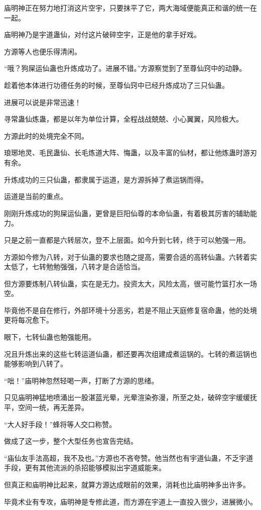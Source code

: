 \begin{this_body}
庙明神正在努力地打消这片空宇，只要抹平了它，两大海域便能真正和谐的统一在一起。

庙明神乃是宇道蛊仙，对付这片破碎空宇，正是他的拿手好戏。

方源等人也便乐得清闲。

“哦？狗屎运仙蛊也升炼成功了。进展不错。”方源察觉到了至尊仙窍中的动静。

趁着他本体进行功德任务的时候，至尊仙窍中已经升炼成功了三只仙蛊。

进展可以说是非常迅速！

寻常蛊仙炼蛊，都是以年为单位计算，全程战战兢兢、小心翼翼，风险极大。

方源此时的处境完全不同。

琅琊地灵、毛民蛊仙、长毛炼道大阵、悔蛊，以及丰富的仙材，都让他炼蛊时游刃有余。

升炼成功的三只仙蛊，都隶属于运道，是方源拆掉了煮运锅而得。

运道是当前的重点。

刚刚升炼成功的狗屎运仙蛊，更曾是巨阳仙尊的本命仙蛊，有着极其厉害的辅助能力。

只是之前一直都是六转层次，登不上层面。如今升到七转，终于可以勉强一用。

方源如今修为八转，对于仙蛊的要求也随之提高，需要合适的高转仙蛊。六转着实太低了，七转勉勉强强，八转才是合适恰当。

但方源要炼制八转仙蛊，实在是无力。投资太大，风险太高，很可能竹篮打水一场空。

毕竟他不是自在修行，外部环境十分恶劣，若是不阻止天庭修复宿命蛊，他的处境更将每况愈下。

眼下，七转仙蛊也勉强能用。

况且升炼出来的这些七转运道仙蛊，都还要再次组建成煮运锅的。七转的煮运锅也能够影响到八转了。

“咄！”庙明神忽然轻喝一声，打断了方源的思绪。

只见庙明神猛地喷涌出一股湛蓝光晕，光晕渲染弥漫，所至之处，破碎空宇缓缓抚平，空间一统，再无差异。

“大人好手段！”蜂将等人交口称赞。

做成了这一步，整个大型任务也宣告完结。

“庙仙友手法高超，我不及也。”方源也不吝夸赞。他当然也有宇道仙蛊，不乏宇道手段，更有其他流派的杀招能够模拟出宇道威能来。

但真正和庙明神比起来，就算方源达成眼前的效果，消耗也比庙明神多出许多。

毕竟术业有专攻，庙明神是专修此道，而方源在宇道上一直投入很少，进展微小。


\end{this_body}

